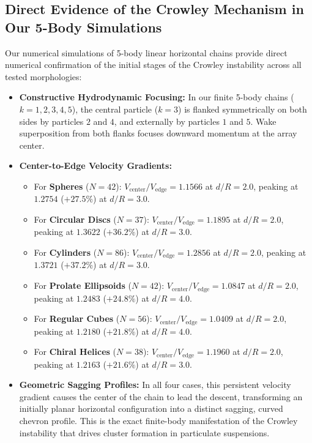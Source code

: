 \documentclass[11pt,a4paper]{article}
\begin{document}
\subsection{Direct Evidence of the Crowley Mechanism in Our 5-Body Simulations}
Our numerical simulations of 5-body linear horizontal chains provide direct numerical confirmation of the initial stages of the Crowley instability across all tested morphologies:
\begin{itemize}
    \item \textbf{Constructive Hydrodynamic Focusing:} In our finite 5-body chains ($k = 1, 2, 3, 4, 5$), the central particle ($k = 3$) is flanked symmetrically on both sides by particles $2$ and $4$, and externally by particles $1$ and $5$. Wake superposition from both flanks focuses downward momentum at the array center.
    \item \textbf{Center-to-Edge Velocity Gradients:}
    \begin{itemize}
        \item For \textbf{Spheres} ($N = 42$): $V_{\text{center}} / V_{\text{edge}} = 1.1566$ at $d/R = 2.0$, peaking at $1.2754$ ($+27.5\%$) at $d/R = 3.0$.
        \item For \textbf{Circular Discs} ($N = 37$): $V_{\text{center}} / V_{\text{edge}} = 1.1895$ at $d/R = 2.0$, peaking at $1.3622$ ($+36.2\%$) at $d/R = 3.0$.
        \item For \textbf{Cylinders} ($N = 86$): $V_{\text{center}} / V_{\text{edge}} = 1.2856$ at $d/R = 2.0$, peaking at $1.3721$ ($+37.2\%$) at $d/R = 3.0$.
        \item For \textbf{Prolate Ellipsoids} ($N = 42$): $V_{\text{center}} / V_{\text{edge}} = 1.0847$ at $d/R = 2.0$, peaking at $1.2483$ ($+24.8\%$) at $d/R = 4.0$.
        \item For \textbf{Regular Cubes} ($N = 56$): $V_{\text{center}} / V_{\text{edge}} = 1.0409$ at $d/R = 2.0$, peaking at $1.2180$ ($+21.8\%$) at $d/R = 4.0$.
        \item For \textbf{Chiral Helices} ($N = 38$): $V_{\text{center}} / V_{\text{edge}} = 1.1960$ at $d/R = 2.0$, peaking at $1.2163$ ($+21.6\%$) at $d/R = 3.0$.
    \end{itemize}
    \item \textbf{Geometric Sagging Profiles:} In all four cases, this persistent velocity gradient causes the center of the chain to lead the descent, transforming an initially planar horizontal configuration into a distinct sagging, curved chevron profile. This is the exact finite-body manifestation of the Crowley instability that drives cluster formation in particulate suspensions.
\end{itemize}
\end{document}
